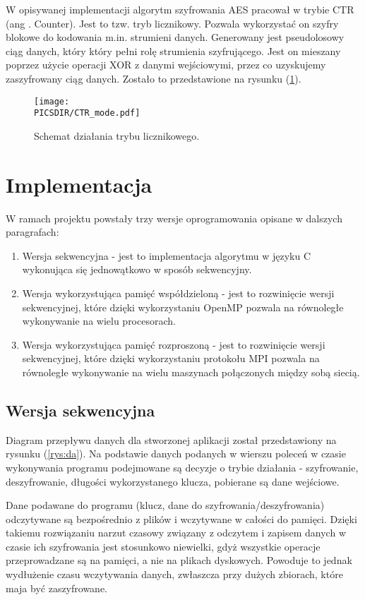 \documentclass[a4paper,12pt]{article}
\def\PICSDIR{PICS}
\begin{document}
W opisywanej implementacji algorytm szyfrowania AES pracował w trybie CTR (ang . Counter). Jest to tzw. tryb licznikowy. Pozwala wykorzystać on szyfry blokowe do kodowania m.in. strumieni danych. Generowany jest pseudolosowy ciąg danych, który który pełni rolę strumienia szyfrującego. Jest on mieszany poprzez użycie operacji XOR z danymi wejściowymi, przez co uzyskujemy zaszyfrowany ciąg danych. Zostało to przedstawione na rysunku (\ref{rys:ctr}).

\begin{figure}
\centering
\texttt{[image: \\PICSDIR/CTR\_mode.pdf]}
\caption{Schemat działania trybu licznikowego.}
\label{rys:ctr}
\end{figure}

\section{Implementacja}
W ramach projektu powstały trzy wersje oprogramowania opisane w dalszych paragrafach:
\begin{enumerate}
\item Wersja sekwencyjna - jest to implementacja algorytmu w języku C wykonująca się jednowątkowo w sposób sekwencyjny.
\item Wersja wykorzystująca pamięć współdzieloną - jest to rozwinięcie wersji sekwencyjnej, które dzięki wykorzystaniu OpenMP pozwala na równoległe wykonywanie na wielu procesorach.
\item Wersja wykorzystująca pamięć rozproszoną - jest to rozwinięcie wersji sekwencyjnej, które dzięki wykorzystaniu protokołu MPI pozwala na równoległe wykonywanie na wielu maszynach połączonych między sobą siecią.
\end{enumerate}



\subsection{Wersja sekwencyjna}

Diagram przepływu danych dla stworzonej aplikacji został przedstawiony na rysunku (\ref{rys:da}).  Na podstawie danych podanych w wierszu poleceń w czasie wykonywania programu podejmowane są decyzje o trybie działania - szyfrowanie, deszyfrowanie, długości wykorzystanego klucza, pobierane są dane wejściowe.

Dane podawane do programu (klucz, dane do szyfrowania/deszyfrowania) odczytywane są bezpośrednio z plików i wczytywane w całości do pamięci. Dzięki takiemu rozwiązaniu narzut czasowy związany z odczytem i zapisem danych w czasie ich szyfrowania jest stosunkowo niewielki, gdyż wszystkie operacje przeprowadzane są na pamięci, a nie na plikach dyskowych. Powoduje to jednak wydłużenie czasu wczytywania danych, zwłaszcza przy dużych zbiorach, które maja być zaszyfrowane.
\end{document}
